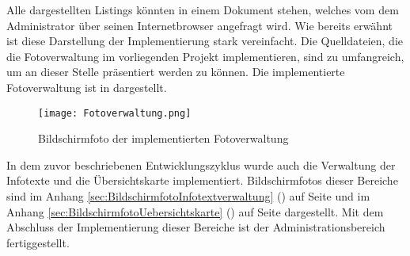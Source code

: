 

Alle dargestellten Listings könnten in einem Dokument stehen, welches vom dem
Administrator über seinen Internetbrowser angefragt wird. Wie bereits erwähnt
ist diese Darstellung der Implementierung stark vereinfacht. Die Quelldateien,
die die Fotoverwaltung im vorliegenden Projekt implementieren, sind zu
umfangreich, um an dieser Stelle präsentiert werden zu können. Die
implementierte Fotoverwaltung ist in  dargestellt.

\begin{figure}[htb]
\centering
\texttt{[image: Fotoverwaltung.png]}
\caption[Fotoverwaltung]{Bildschirmfoto der implementierten Fotoverwaltung}
\label{fig:Fotoverwaltung}
\end{figure}

In dem zuvor beschriebenen Entwicklungszyklus wurde auch die Verwaltung der
Infotexte und die Übersichtskarte implementiert. Bildschirmfotos dieser Bereiche
sind im Anhang \ref{sec:BildschirmfotoInfotextverwaltung}
() auf Seite
\pageref{sec:BildschirmfotoInfotextverwaltung} und im Anhang
\ref{sec:BildschirmfotoUebersichtskarte}
() auf Seite
\pageref{sec:BildschirmfotoUebersichtskarte} dargestellt. Mit dem Abschluss der
Implementierung dieser Bereiche ist der Administrationsbereich fertiggestellt.